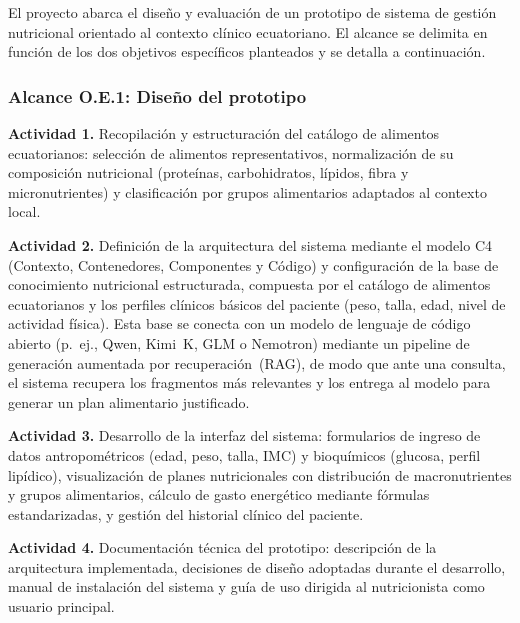 El proyecto abarca el diseño y evaluación de un prototipo de sistema
de gestión nutricional orientado al contexto clínico ecuatoriano.
El alcance se delimita en función de los dos objetivos específicos
planteados y se detalla a continuación.

\subsubsection{Alcance O.E.1: Diseño del prototipo}

\textbf{Actividad 1.} Recopilación y estructuración del
catálogo de alimentos ecuatorianos: selección de alimentos
representativos, normalización de su composición nutricional
(proteínas, carbohidratos, lípidos, fibra y micronutrientes) y
clasificación por grupos alimentarios adaptados al contexto local.

\medskip

\textbf{Actividad 2.} Definición de la arquitectura del sistema
mediante el modelo C4 (Contexto, Contenedores, Componentes y Código)
y configuración de la base de conocimiento nutricional estructurada,
compuesta por el catálogo de alimentos ecuatorianos y los perfiles
clínicos básicos del paciente (peso, talla, edad, nivel de actividad
física). Esta base se conecta con un modelo de lenguaje de código
abierto (p.~ej., Qwen, Kimi~K, GLM o Nemotron) mediante un pipeline
de generación aumentada por recuperación~(RAG), de modo que ante una
consulta, el sistema recupera los fragmentos más relevantes y los
entrega al modelo para generar un plan alimentario justificado.

\medskip

\textbf{Actividad 3.} Desarrollo de la interfaz del sistema:
formularios de ingreso de datos antropométricos (edad, peso, talla,
IMC) y bioquímicos (glucosa, perfil lipídico), visualización de
planes nutricionales con distribución de macronutrientes y grupos
alimentarios, cálculo de gasto energético mediante fórmulas
estandarizadas, y gestión del historial clínico del paciente.

\medskip

\textbf{Actividad 4.} Documentación técnica del prototipo: descripción
de la arquitectura implementada, decisiones de diseño adoptadas durante
el desarrollo, manual de instalación del sistema y guía de uso dirigida
al nutricionista como usuario principal.

